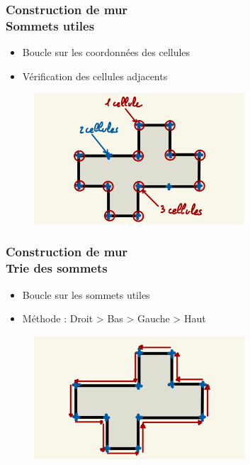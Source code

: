 \documentclass{beamer}
\begin{document}
\begin{frame}
    \frametitle{Construction de mur \\
                \small Sommets utiles}
    \begin{block}{}
        \begin{itemize}
            \item Boucle sur les coordonnées des cellules
            \item Vérification des cellules adjacents
        \end{itemize}
    \end{block}
    \begin{figure}
        \centering
        \includegraphics[width=0.7\textwidth]{images/sommets_utiles.jpg}
    \end{figure}
\end{frame}

\begin{frame}
    \frametitle{Construction de mur \\
                \small Trie des sommets}
    \begin{block}{}
        \begin{itemize}
            \item Boucle sur les sommets utiles
            \item Méthode : Droit > Bas > Gauche > Haut
        \end{itemize}
    \end{block}
    \begin{figure}
        \centering
        \includegraphics[width=0.7\textwidth]{images/tri_sommet.jpg}
    \end{figure}
\end{frame}
\end{document}
